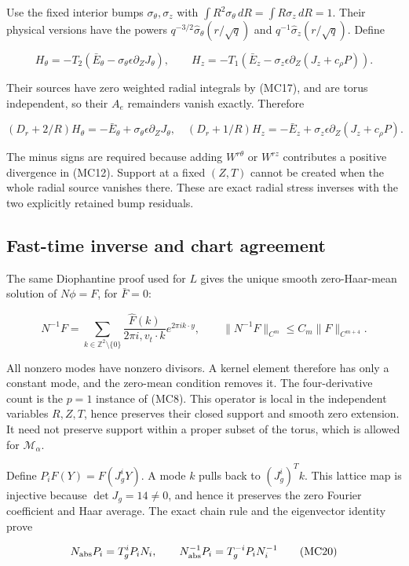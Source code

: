 \documentclass[10pt,a4paper]{article}
\begin{document}
Use the fixed interior bumps \(\sigma_\theta,\sigma_z\) with \(\int R^2\sigma_\theta\,dR=\int R\sigma_z\,dR=1\). Their physical versions have the powers \(q^{-3/2}\widehat\sigma_\theta(r/\sqrt q)\) and \(q^{-1}\widehat\sigma_z(r/\sqrt q)\). Define

\[
H_\theta=-T_2(\bar E_\theta-\sigma_\theta\epsilon\partial_ZJ_\theta),
\qquad
H_z=-T_1(\bar E_z-\sigma_z\epsilon\partial_Z(J_z+c_\rho P)).
\]

Their sources have zero weighted radial integrals by (MC17), and are torus independent, so their \(A_e\) remainders vanish exactly. Therefore

\[
(D_r+2/R)H_\theta=-\bar E_\theta+\sigma_\theta\epsilon\partial_ZJ_\theta,
\quad
(D_r+1/R)H_z=-\bar E_z+\sigma_z\epsilon\partial_Z(J_z+c_\rho P).
\tag{MC18}
\]

The minus signs are required because adding \(W^{r\theta}\) or \(W^{rz}\) contributes a positive divergence in (MC12). Support at a fixed \((Z,T)\) cannot be created when the whole radial source vanishes there. These are exact radial stress inverses with the two explicitly retained bump residuals.

\subsection{Fast-time inverse and chart agreement}

The same Diophantine proof used for \(L\) gives the unique smooth zero-Haar-mean solution of \(N\phi=F\), for \(\bar F=0\):

\[
N^{-1}F=\sum_{k\in\mathbb Z^2\setminus\{0\}}
\frac{\widehat F(k)}{2\pi i,v_t\cdot k}e^{2\pi ik\cdot y},
\qquad
\|N^{-1}F\|_{C^m}\le C_m\|F\|_{C^{m+4}}.
\tag{MC19}
\]

All nonzero modes have nonzero divisors. A kernel element therefore has only a constant mode, and the zero-mean condition removes it. The four-derivative count is the \(p=1\) instance of (MC8). This operator is local in the independent variables \(R,Z,T\), hence preserves their closed support and smooth zero extension. It need not preserve support within a proper subset of the torus, which is allowed for \(\mathcal M_\alpha\).

Define \(P_iF(Y)=F(J_g^iY)\). A mode \(k\) pulls back to \((J_g^i)^Tk\). This lattice map is injective because \(\det J_g=14\ne0\), and hence it preserves the zero Fourier coefficient and Haar average. The exact chain rule and the eigenvector identity prove

\[
N_{\rm abs}P_i=T_g^iP_iN_i,
\qquad N_{\rm abs}^{-1}P_i=T_g^{-i}P_iN_i^{-1}
\tag{MC20}
\]
\end{document}
